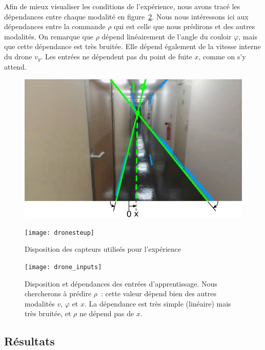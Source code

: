 \documentclass[../main]{subfiles}
\begin{document}
Afin de mieux visualiser les conditions de l'expérience, nous avons tracé les dépendances entre chaque modalité en figure~\ref{fig:drone_inp}.
Nous nous intéressons ici aux dépendances entre la commande $\rho$ qui est celle que nous prédirons et des autres modalités.
On remarque que $\rho$ dépend linéairement de l'angle du couloir $\varphi$, mais que cette dépendance est très bruitée. Elle dépend également de la vitesse interne du drone $v_y$. 
Les entrées ne dépendent pas du point de fuite $x$, comme on s'y attend.

\begin{figure}
	\begin{minipage}{0.5\textwidth}
	\includegraphics[width=\textwidth]{visudrone.pdf}
	\end{minipage}
	\begin{minipage}{0.5\textwidth}
	\texttt{[image: dronesteup]}
	\end{minipage}
	\caption{Disposition des capteurs utilisés pour l'expérience}
	\label{fig:drone}
	\end{figure}

\begin{figure}
	\centering\texttt{[image: drone\_inputs]}
	\caption{Disposition et dépendances des entrées d'apprentissage. Nous chercherons à prédire $\rho$~: cette valeur dépend bien des autres modalités $v$, $\varphi$ et $x$. La dépendance est très simple (linéaire) mais très bruitée, et $\rho$ ne dépend pas de $x$. \label{fig:drone_inp}}
\end{figure}


\subsection{Résultats}
\end{document}
